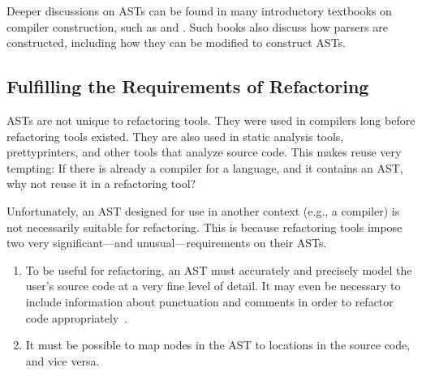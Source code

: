 \documentclass[prodmode]{acmlarge}
\begin{document}
Deeper discussions on ASTs can be found in many introductory textbooks on
compiler construction, such as \cite{aho06compilers} and
\cite{torczon11engineering}.  Such books also discuss how parsers are
constructed, including how they can be modified to construct ASTs.

\FloatBarrier

\subsection{Fulfilling the Requirements of Refactoring}
\label{ss:reqs}


ASTs are not unique to refactoring tools.  They were used in compilers long
before refactoring tools existed.  They are also used in static analysis tools,
prettyprinters, and other tools that analyze source code.  This makes reuse
very tempting: If there is already a compiler for a language, and it contains
an AST, why not reuse it in a refactoring tool?

Unfortunately, an AST designed for use in another context (e.g., a compiler) is
not necessarily suitable for refactoring.  This is because refactoring tools
impose two very significant---and unusual---requirements on their ASTs.

\begin{enumerate}
\item To be useful for refactoring, an AST must accurately and precisely model
the user's source code at a very fine level of detail.  It may even be
necessary to include information about punctuation and comments in order to
refactor code appropriately~\cite{sommerlad08retaining}.
\item It must be possible to map nodes in the AST to locations in the
source code, and vice versa.
\end{enumerate}
\end{document}
